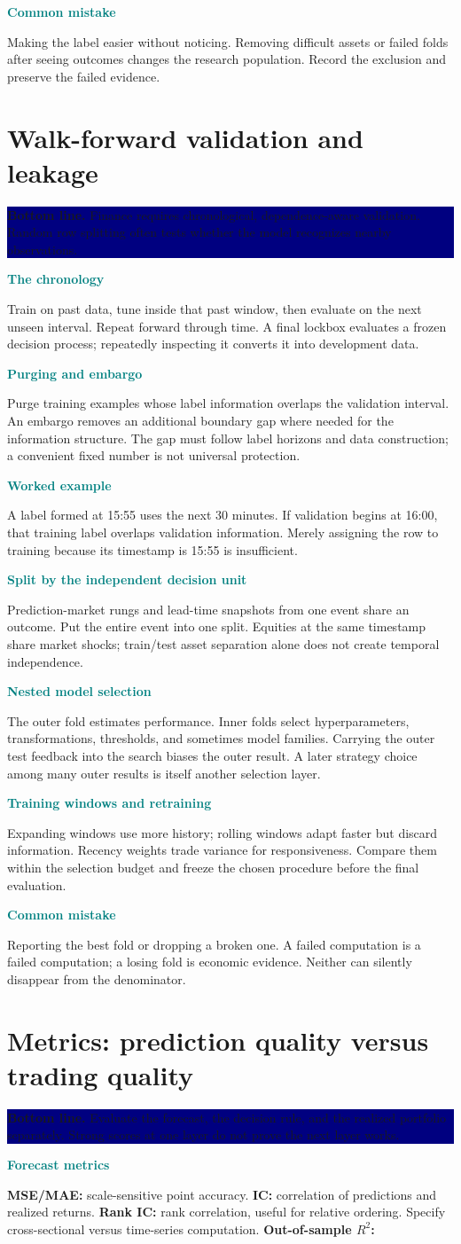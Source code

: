\documentclass[10pt,letterpaper]{article}
\newcommand{\bl}[1]{\noindent\colorbox{navy}{\parbox{\dimexpr\linewidth-2\fboxsep}{\color{white}\textbf{Bottom line.} #1}}\par\medskip}
\newcommand{\topic}[2]{\clearpage\section{#1}\bl{#2}}
\newcommand{\sub}[1]{\par\textbf{\textcolor{teal}{#1}}\par}
\newcommand{\ex}[1]{\sub{Worked example}#1}
\newcommand{\pit}[1]{\sub{Common mistake}#1}
\begin{document}
\pit{Making the label easier without noticing. Removing difficult assets or failed folds after seeing outcomes changes the research population. Record the exclusion and preserve the failed evidence.}
\topic{Walk-forward validation and leakage}{Finance requires chronological, dependence-aware validation. Random row splitting often tests whether the model recognizes nearby observations.}
\sub{The chronology}
Train on past data, tune inside that past window, then evaluate on the next unseen interval. Repeat forward through time. A final lockbox evaluates a frozen decision process; repeatedly inspecting it converts it into development data.
\sub{Purging and embargo}
Purge training examples whose label information overlaps the validation interval. An embargo removes an additional boundary gap where needed for the information structure. The gap must follow label horizons and data construction; a convenient fixed number is not universal protection.
\ex{A label formed at 15:55 uses the next 30 minutes. If validation begins at 16:00, that training label overlaps validation information. Merely assigning the row to training because its timestamp is 15:55 is insufficient.}
\sub{Split by the independent decision unit}
Prediction-market rungs and lead-time snapshots from one event share an outcome. Put the entire event into one split. Equities at the same timestamp share market shocks; train/test asset separation alone does not create temporal independence.
\sub{Nested model selection}
The outer fold estimates performance. Inner folds select hyperparameters, transformations, thresholds, and sometimes model families. Carrying the outer test feedback into the search biases the outer result. A later strategy choice among many outer results is itself another selection layer.
\sub{Training windows and retraining}
Expanding windows use more history; rolling windows adapt faster but discard information. Recency weights trade variance for responsiveness. Compare them within the selection budget and freeze the chosen procedure before the final evaluation.
\pit{Reporting the best fold or dropping a broken one. A failed computation is a failed computation; a losing fold is economic evidence. Neither can silently disappear from the denominator.}
\topic{Metrics: prediction quality versus trading quality}{Evaluate the forecast, the decision rule, and the realized portfolio separately. Strong scores at one layer do not prove the next layer works.}
\sub{Forecast metrics}
\textbf{MSE/MAE:} scale-sensitive point accuracy. \textbf{IC:} correlation of predictions and realized returns. \textbf{Rank IC:} rank correlation, useful for relative ordering. Specify cross-sectional versus time-series computation. \textbf{Out-of-sample $R^2$:}
\end{document}

